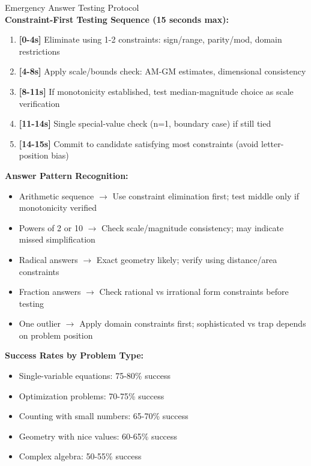 \documentclass{article}
\begin{document}
\begin{classifybox}{Emergency Answer Testing Protocol}
{\footnotesize\textcolor{timegreen}{}}\\
\textbf{Constraint-First Testing Sequence (15 seconds max):}
\begin{enumerate}[nosep]
\item \textbf{[0-4s]} Eliminate using 1-2 constraints: sign/range, parity/mod, domain restrictions
\item \textbf{[4-8s]} Apply scale/bounds check: AM-GM estimates, dimensional consistency
\item \textbf{[8-11s]} If monotonicity established, test median-magnitude choice as scale verification
\item \textbf{[11-14s]} Single special-value check (n=1, boundary case) if still tied
\item \textbf{[14-15s]} Commit to candidate satisfying most constraints (avoid letter-position bias)
\end{enumerate}

\textbf{Answer Pattern Recognition:}
\begin{itemize}[nosep]
\item Arithmetic sequence $\rightarrow$ Use constraint elimination first; test middle only if monotonicity verified
\item Powers of 2 or 10 $\rightarrow$ Check scale/magnitude consistency; may indicate missed simplification
\item Radical answers $\rightarrow$ Exact geometry likely; verify using distance/area constraints
\item Fraction answers $\rightarrow$ Check rational vs irrational form constraints before testing
\item One outlier $\rightarrow$ Apply domain constraints first; sophisticated vs trap depends on problem position
\end{itemize}

\textbf{Success Rates by Problem Type:}
\begin{itemize}[nosep]
\item Single-variable equations: 75-80\% success
\item Optimization problems: 70-75\% success
\item Counting with small numbers: 65-70\% success
\item Geometry with nice values: 60-65\% success
\item Complex algebra: 50-55\% success
\end{itemize}
\end{classifybox}
\end{document}
